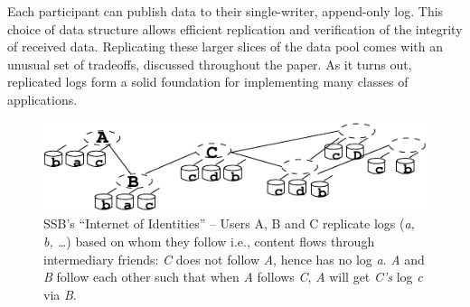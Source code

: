 \documentclass[9pt,sigconf]{acmart}
\begin{document}
Each participant can publish data to their single-writer, append-only log. This choice of data structure allows efficient replication and verification of the integrity of received data. Replicating these larger slices of the data pool comes with an unusual set of tradeoffs, discussed throughout the paper. As it turns out, replicated logs form a solid foundation for implementing many classes of applications.


\begin{figure}[htb]
  \includegraphics[width=0.9\columnwidth]{figs/net-of-people.pdf}
  \caption{SSB's ``Internet of Identities'' -- {\rm\small Users A, B and C
    replicate logs ({\em a, b, \ldots}) based on whom they follow i.e., content
    flows through intermediary friends: {\em C} does not follow {\em A}, hence has no log {\em a}. {\em A} and {\em B} follow each other such that when {\em A} follows {\em C}, {\em A} will get {\em C's} log {\em c} via {\em B}.}\label{fig:net-of-people}}
\end{figure}

\end{document}
